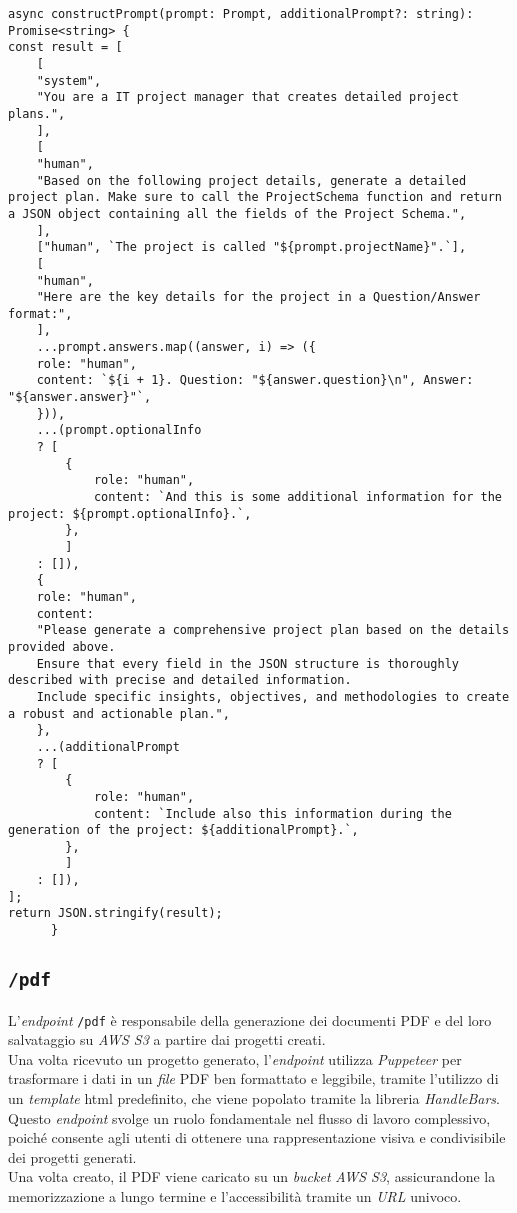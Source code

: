 \begin{lstlisting}[caption={Funzione di costruzione del \gls{prompt}}, label={lst:funzione-prompt}]
async constructPrompt(prompt: Prompt, additionalPrompt?: string): Promise<string> {
const result = [
    [
    "system",
    "You are a IT project manager that creates detailed project plans.",
    ],
    [
    "human",
    "Based on the following project details, generate a detailed project plan. Make sure to call the ProjectSchema function and return a JSON object containing all the fields of the Project Schema.",
    ],
    ["human", `The project is called "${prompt.projectName}".`],
    [
    "human",
    "Here are the key details for the project in a Question/Answer format:",
    ],
    ...prompt.answers.map((answer, i) => ({
    role: "human",
    content: `${i + 1}. Question: "${answer.question}\n", Answer: "${answer.answer}"`,
    })),
    ...(prompt.optionalInfo
    ? [
        {
            role: "human",
            content: `And this is some additional information for the project: ${prompt.optionalInfo}.`,
        },
        ]
    : []),
    {
    role: "human",
    content:
    "Please generate a comprehensive project plan based on the details provided above. 
    Ensure that every field in the JSON structure is thoroughly described with precise and detailed information. 
    Include specific insights, objectives, and methodologies to create a robust and actionable plan.",
    },
    ...(additionalPrompt
    ? [
        {
            role: "human",
            content: `Include also this information during the generation of the project: ${additionalPrompt}.`,
        },
        ]
    : []),
];
return JSON.stringify(result);
      }
\end{lstlisting}
\subsection*{\texttt{/pdf}}
L’\textit{endpoint} \texttt{/pdf} è responsabile della generazione dei documenti PDF e del loro salvataggio su \textit{AWS S3} a partire dai progetti creati.\\
Una volta ricevuto un progetto generato, l’\textit{endpoint} utilizza \textit{Puppeteer} per trasformare i dati in un \textit{file} PDF ben formattato e leggibile, tramite l'utilizzo di un \textit{template} \gls{html} predefinito, che viene popolato tramite la libreria \textit{HandleBars}.\\

\noindent Questo \textit{endpoint} svolge un ruolo fondamentale nel flusso di lavoro complessivo, poiché consente agli utenti di ottenere una rappresentazione visiva e condivisibile dei progetti generati.\\
Una volta creato, il PDF viene caricato su un \textit{bucket} \textit{AWS S3}, assicurandone la memorizzazione a lungo termine e l’accessibilità tramite un \textit{URL} univoco.\\ 

